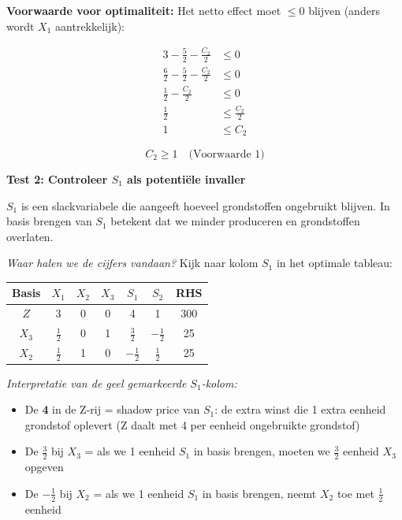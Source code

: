 \documentclass[a4paper,11pt]{article}
\begin{document}
\begin{oefenblok}
    \textbf{Voorwaarde voor optimaliteit:} Het netto effect moet $\leq 0$ blijven (anders wordt $X_1$ aantrekkelijk):

    \begin{align*}
        3 - \frac{5}{2} - \frac{C_2}{2}           & \leq 0             \\
        \frac{6}{2} - \frac{5}{2} - \frac{C_2}{2} & \leq 0             \\
        \frac{1}{2} - \frac{C_2}{2}               & \leq 0             \\
        \frac{1}{2}                               & \leq \frac{C_2}{2} \\
        1                                         & \leq C_2
    \end{align*}

    $$\boxed{C_2 \geq 1} \quad \text{(Voorwaarde 1)}$$

    \textbf{Test 2: Controleer $S_1$ als potentiële invaller}

    $S_1$ is een slackvariabele die aangeeft hoeveel grondstoffen ongebruikt blijven. In basis brengen van $S_1$ betekent dat we minder produceren en grondstoffen overlaten.

    \textit{Waar halen we de cijfers vandaan?} Kijk naar kolom $S_1$ in het optimale tableau:

    \begin{center}
        \begin{tabular}{c|ccccc|c}
            \hline
            Basis & $X_1$         & $X_2$ & $X_3$ & $S_1$                               & $S_2$          & RHS \\
            \hline
            $Z$   & 3             & 0     & 0     & \cellcolor{yellow!30}4              & 1              & 300 \\
            $X_3$ & $\frac{1}{2}$ & 0     & 1     & \cellcolor{yellow!30}$\frac{3}{2}$  & $-\frac{1}{2}$ & 25  \\
            $X_2$ & $\frac{1}{2}$ & 1     & 0     & \cellcolor{yellow!30}$-\frac{1}{2}$ & $\frac{1}{2}$  & 25  \\
            \hline
        \end{tabular}
    \end{center}

    \textit{Interpretatie van de geel gemarkeerde $S_1$-kolom:}
    \begin{itemize}
        \item De \textbf{4} in de Z-rij = shadow price van $S_1$: de extra winst die 1 extra eenheid grondstof oplevert (Z daalt met 4 per eenheid ongebruikte grondstof)
        \item De \textbf{$\frac{3}{2}$} bij $X_3$ = als we 1 eenheid $S_1$ in basis brengen, moeten we $\frac{3}{2}$ eenheid $X_3$ opgeven
        \item De \textbf{$-\frac{1}{2}$} bij $X_2$ = als we 1 eenheid $S_1$ in basis brengen, neemt $X_2$ toe met $\frac{1}{2}$ eenheid
    \end{itemize}


\end{oefenblok}
\end{document}
